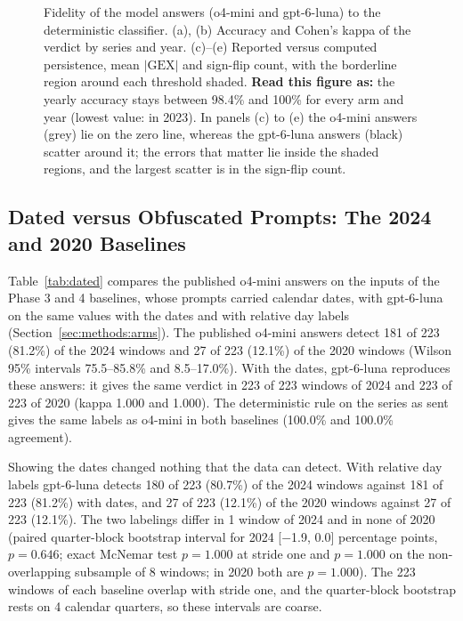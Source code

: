 \begin{figure}[H]
\centering
\resultfigure{\figFidelity}
\caption{Fidelity of the model answers (o4-mini and gpt-6-luna) to the deterministic classifier. (a), (b) Accuracy and Cohen's kappa of the verdict by series and year. (c)--(e) Reported versus computed persistence, mean $|\mathrm{GEX}|$ and sign-flip count, with the borderline region around each threshold shaded. \textbf{Read this figure as:} the yearly accuracy stays between 98.4\% and 100\% for every arm and year (lowest value:  in 2023). In panels (c) to (e) the o4-mini answers (grey) lie on the zero line, whereas the gpt-6-luna answers (black) scatter around it; the errors that matter lie inside the shaded regions, and the largest scatter is in the sign-flip count.}
\label{fig:fidelity}
\end{figure}

\subsection{Dated versus Obfuscated Prompts: The 2024 and 2020 Baselines}
\label{sec:results:dated}

Table~\ref{tab:dated} compares the published o4-mini answers on the inputs of the Phase 3 and 4 baselines, whose prompts carried calendar dates, with gpt-6-luna on the same values with the dates and with relative day labels (Section~\ref{sec:methods:arms}).
The published o4-mini answers detect 181 of 223 (81.2\%) of the 2024 windows and 27 of 223 (12.1\%) of the 2020 windows (Wilson 95\% intervals 75.5--85.8\% and 8.5--17.0\%). With the dates, gpt-6-luna reproduces these answers: it gives the same verdict in 223 of 223 windows of 2024 and 223 of 223 of 2020 (kappa 1.000 and 1.000). The deterministic rule on the series as sent gives the same labels as o4-mini in both baselines (100.0\% and 100.0\% agreement).

Showing the dates changed nothing that the data can detect. With relative day labels gpt-6-luna detects 180 of 223 (80.7\%) of the 2024 windows against 181 of 223 (81.2\%) with dates, and 27 of 223 (12.1\%) of the 2020 windows against 27 of 223 (12.1\%). The two labelings differ in 1 window of 2024 and in none of 2020 (paired quarter-block bootstrap interval for 2024 [$-$1.9, 0.0] percentage points, $p=0.646$; exact McNemar test $p=1.000$ at stride one and $p=1.000$ on the non-overlapping subsample of 8 windows; in 2020 both are $p=1.000$). The 223 windows of each baseline overlap with stride one, and the quarter-block bootstrap rests on 4 calendar quarters, so these intervals are coarse.

